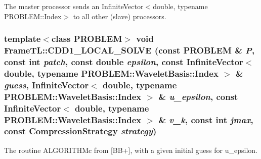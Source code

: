 The master processor sends an InfiniteVector$<$double, typename PROBLEM::Index$>$ to all other (slave) processors. \hypertarget{namespaceFrameTL_8a92efb82d1634c8cf05737d5164b731}{
\subsubsection[CDD1\_\-LOCAL\_\-SOLVE]{\setlength{\rightskip}{0pt plus 5cm}template$<$class PROBLEM$>$ void FrameTL::CDD1\_\-LOCAL\_\-SOLVE (const PROBLEM \& {\em P}, \/  const int {\em patch}, \/  const double {\em epsilon}, \/  const InfiniteVector$<$ double, typename PROBLEM::WaveletBasis::Index $>$ \& {\em guess}, \/  InfiniteVector$<$ double, typename PROBLEM::WaveletBasis::Index $>$ \& {\em u\_\-epsilon}, \/  const InfiniteVector$<$ double, typename PROBLEM::WaveletBasis::Index $>$ \& {\em v\_\-k}, \/  const int {\em jmax}, \/  const CompressionStrategy {\em strategy})}}
\label{namespaceFrameTL_8a92efb82d1634c8cf05737d5164b731}


The routine ALGORITHMc from \mbox{[}BB+\mbox{]}, with a given initial guess for u\_\-epsilon. 

